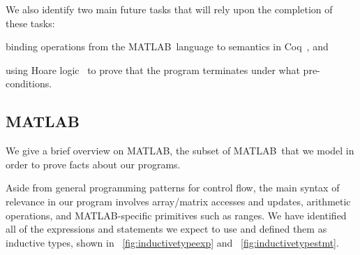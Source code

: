 \documentclass[11pt,conference]{IEEEtran}
\newcommand{\matlab}{MATLAB}
\newcommand{\mmatlab}{\textmu\matlab}
\theoremstyle{plain} %
\theoremstyle{definition}
\theoremstyle{remark}
\begin{document}
We also identify two main future tasks that will rely upon the completion of
these tasks:
\begin{inlist}
\item binding operations from the \mmatlab\ language to semantics in
    Coq~\cite{Coq}, and
\item using Hoare logic~\cite{Hoare_1969} to prove that the program terminates
    under what pre-conditions.
\end{inlist}

\subsection{\mmatlab}\label{S:mmatlab}

We give a brief overview on \mmatlab, the subset of \matlab\ that we model in
order to prove facts about our programs.

Aside from general programming patterns for control flow, the main syntax of
relevance in our program involves array/matrix accesses and updates, arithmetic
operations, and \matlab-specific primitives such as ranges. We have identified
all of the expressions and statements we expect to use and defined them as
inductive types, shown in \figurename~\ref{fig:inductivetypeexp} and
\figurename~\ref{fig:inductivetypestmt}.
\end{document}

